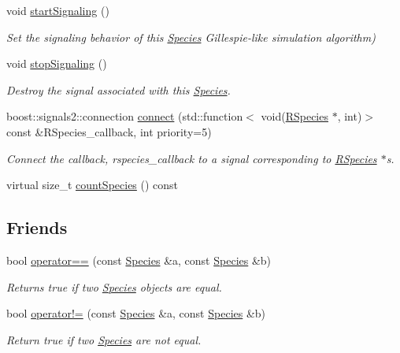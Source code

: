 \begin{DoxyCompactItemize}
void \hyperlink{classchem_1_1Species_a2d3d9f6e7c7d9c7bdd87ff5373a7d08c}{start\-Signaling} ()
\begin{DoxyCompactList}\small\item\em Set the signaling behavior of this \hyperlink{classchem_1_1Species}{Species} Gillespie-\/like simulation algorithm) \end{DoxyCompactList}\item 
void \hyperlink{classchem_1_1Species_a9d34195d05f3e35e00dd20892ff7393b}{stop\-Signaling} ()
\begin{DoxyCompactList}\small\item\em Destroy the signal associated with this \hyperlink{classchem_1_1Species}{Species}. \end{DoxyCompactList}\item 
boost\-::signals2\-::connection \hyperlink{classchem_1_1Species_a9a582e18e231a65761cb10c14d0a0a68}{connect} (std\-::function$<$ void(\hyperlink{classchem_1_1RSpecies}{R\-Species} $\ast$, int)$>$ const \&R\-Species\-\_\-callback, int priority=5)
\begin{DoxyCompactList}\small\item\em Connect the callback, rspecies\-\_\-callback to a signal corresponding to \hyperlink{classchem_1_1RSpecies}{R\-Species} $\ast$s. \end{DoxyCompactList}\item 
virtual size\-\_\-t \hyperlink{classchem_1_1Species_a5e8aedfe4c4b5e08fb0ee672c3d80ace}{count\-Species} () const 
\end{DoxyCompactItemize}
\subsection*{Friends}
\begin{DoxyCompactItemize}
\item 
bool \hyperlink{classchem_1_1Species_a22987c5719b74c50465256ea5b9d80bf}{operator==} (const \hyperlink{classchem_1_1Species}{Species} \&a, const \hyperlink{classchem_1_1Species}{Species} \&b)
\begin{DoxyCompactList}\small\item\em Returns true if two \hyperlink{classchem_1_1Species}{Species} objects are equal. \end{DoxyCompactList}\item 
bool \hyperlink{classchem_1_1Species_aff630d716711fbbab3bc7f598230316b}{operator!=} (const \hyperlink{classchem_1_1Species}{Species} \&a, const \hyperlink{classchem_1_1Species}{Species} \&b)
\begin{DoxyCompactList}\small\item\em Return true if two \hyperlink{classchem_1_1Species}{Species} are not equal. \end{DoxyCompactList}\end{DoxyCompactItemize}


